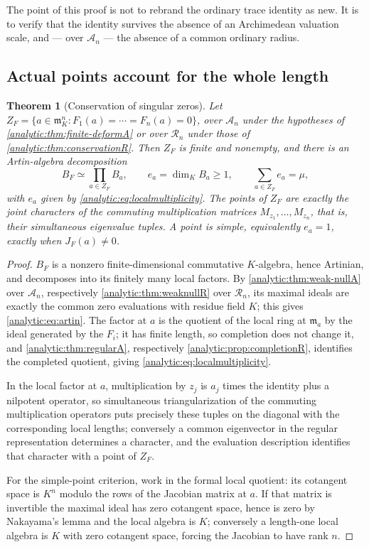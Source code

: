 \documentclass[11pt,letterpaper]{article}
\newtheorem{theorem}{Theorem}[section]
\theoremstyle{definition}
\theoremstyle{remark}
\newcommand{\A}{\mathscr A}
\newcommand{\RR}{\mathscr R}
\newcommand{\m}{\mathfrak m}
\numberwithin{equation}{section}
\begin{document}
The point of this proof is not to rebrand the ordinary trace identity as
new. It is to verify that the identity survives the absence of an
Archimedean valuation scale, and --- over $\A_n$ --- the absence of a common
ordinary radius.

\subsection{Actual points account for the whole length}
\label{analytic:subsec:zeros}
\begin{theorem}[Conservation of singular zeros]\label{analytic:thm:zeros}
Let $Z_F=\{a\in\m_K^n:F_1(a)=\cdots=F_n(a)=0\}$, over $\A_n$ under the
hypotheses of \cref{analytic:thm:finite-deformA} or over $\RR_n$ under
those of \cref{analytic:thm:conservationR}. Then $Z_F$ is finite and
nonempty, and there is an Artin-algebra decomposition
\begin{equation}\label{analytic:eq:artin}
 B_F\simeq\prod_{a\in Z_F}B_a,\qquad e_a=\dim_KB_a\ge1,\qquad
 \sum_{a\in Z_F}e_a=\mu ,
\end{equation}
with $e_a$ given by \eqref{analytic:eq:localmultiplicity}. The points of
$Z_F$ are exactly the joint characters of the commuting multiplication
matrices $M_{z_1},\ldots,M_{z_n}$, that is, their simultaneous eigenvalue
tuples. A point is simple, equivalently $e_a=1$, exactly when
$J_F(a)\ne0$.
\end{theorem}
\begin{proof}
$B_F$ is a nonzero finite-dimensional commutative $K$-algebra, hence
Artinian, and decomposes into its finitely many local factors. By
\cref{analytic:thm:weak-nullA} over $\A_n$, respectively
\cref{analytic:thm:weaknullR} over $\RR_n$, its maximal ideals are exactly
the common zero evaluations with residue field $K$; this gives
\eqref{analytic:eq:artin}. The factor at $a$ is the quotient of the local
ring at $\m_a$ by the ideal generated by the $F_i$; it has finite length, so
completion does not change it, and
\cref{analytic:thm:regularA}, respectively
\cref{analytic:prop:completionR}, identifies the completed quotient,
giving \eqref{analytic:eq:localmultiplicity}.

In the local factor at $a$, multiplication by $z_j$ is $a_j$ times the
identity plus a nilpotent operator, so simultaneous triangularization of the
commuting multiplication operators puts precisely these tuples on the
diagonal with the corresponding local lengths; conversely a common
eigenvector in the regular representation determines a character, and the
evaluation description identifies that character with a point of $Z_F$.

For the simple-point criterion, work in the formal local quotient: its
cotangent space is $K^n$ modulo the rows of the Jacobian matrix at $a$. If
that matrix is invertible the maximal ideal has zero cotangent space, hence
is zero by Nakayama's lemma and the local algebra is $K$; conversely a
length-one local algebra is $K$ with zero cotangent space, forcing the
Jacobian to have rank $n$.
\end{proof}
\end{document}
